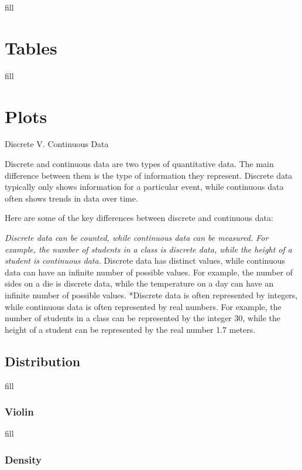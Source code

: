 \documentclass[
  b5paper]{book}
\begin{document}
fill

\hypertarget{tables}{%
\section{Tables}\label{tables}}

fill

\hypertarget{plots}{%
\section{Plots}\label{plots}}

Discrete V. Continuous Data

Discrete and continuous data are two types of quantitative data. The main difference between them is the type of information they represent. Discrete data typically only shows information for a particular event, while continuous data often shows trends in data over time.

Here are some of the key differences between discrete and continuous data:

\emph{Discrete data can be counted, while continuous data can be measured. For example, the number of students in a class is discrete data, while the height of a student is continuous data.} Discrete data has distinct values, while continuous data can have an infinite number of possible values. For example, the number of sides on a die is discrete data, while the temperature on a day can have an infinite number of possible values. *Discrete data is often represented by integers, while continuous data is often represented by real numbers. For example, the number of students in a class can be represented by the integer 30, while the height of a student can be represented by the real number 1.7 meters.

\hypertarget{distribution}{%
\subsection*{Distribution}\label{distribution}}

fill

\hypertarget{violin}{%
\subsubsection*{Violin}\label{violin}}

fill

\hypertarget{density}{%
\subsubsection*{Density}\label{density}}
\end{document}
